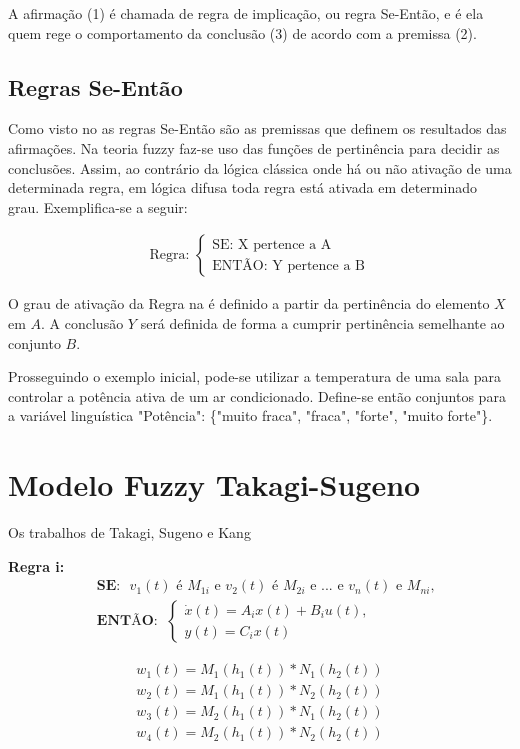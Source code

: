 A afirmação (1) é chamada de regra de implicação, ou regra Se-Então, e é ela quem rege o comportamento da conclusão (3) de acordo com a premissa (2). 

\subsection{Regras Se-Então}
Como visto no  as regras Se-Então são as premissas que definem os resultados das afirmações. Na teoria fuzzy faz-se uso das funções de pertinência para decidir as conclusões. Assim, ao contrário da lógica clássica onde há ou não ativação de uma determinada regra, em lógica difusa toda regra está ativada em determinado grau. Exemplifica-se a seguir:

\begin{align*} \label{eqRegraDef}
\text{Regra: }
\begin{cases}
	\text{SE: X pertence a A} \\
	\text{ENTÃO: Y pertence a B}
\end{cases}		
\end{align*}

O grau de ativação da Regra na  é definido a partir da pertinência do elemento $X$ em $A$. A conclusão $Y$ será definida de forma a cumprir pertinência semelhante ao conjunto $B$.

Prosseguindo o exemplo inicial, pode-se utilizar a temperatura de uma sala para controlar a potência ativa de um ar condicionado. Define-se então conjuntos para a variável linguística "Potência": \{"muito fraca", "fraca", "forte", "muito forte"\}. 

\section{Modelo Fuzzy Takagi-Sugeno} \label{secTakSug}
Os trabalhos de Takagi, Sugeno \cite{takagiSugeno} e Kang \cite{kang}

\textbf{Regra i:}
\begin{align}
&\textbf{SE:} \text{ $v_1(t)$ é $M_{1i}$ e $v_2(t)$ é $M_{2i}$ e ... e $v_n(t)$ e $M_{ni}$,} \\
&\textbf{ENTÃO}: \ \ \begin{cases}
\dot{x}(t) = A_ix(t) + B_iu(t),\\
y(t) = C_ix(t)
\end{cases}
\label{eqRegraIGeral}
\end{align}


	\begin{equation}
	\begin{aligned}
		w_{1}(t) = M_1(h_1(t)) * N_1(h_2(t)) \\
		w_{2}(t) = M_1(h_1(t)) * N_2(h_2(t)) \\
		w_{3}(t) = M_2(h_1(t)) * N_1(h_2(t)) \\
		w_{4}(t) = M_2(h_1(t)) * N_2(h_2(t))
	\end{aligned}
	\end{equation}
	
